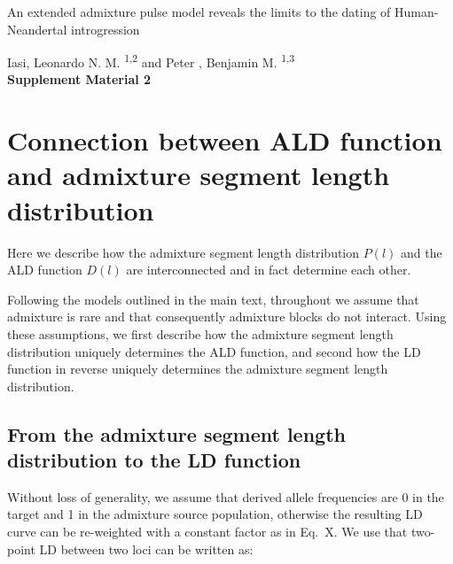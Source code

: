 \documentclass[11pt]{article}
\begin{document}
\begin{titlepage}


    \vspace*{1cm}
        
        
    \begin{center}       
        \large
        \vspace{1cm}
        An extended admixture pulse model reveals the limits to the dating of Human-Neandertal introgression
        
       \vspace{1.0cm}
        \large
        Iasi, Leonardo N. M. \textsuperscript{1,2} and Peter , Benjamin M. \textsuperscript{1,3} \\ 
        
        \vspace{1.0cm}
            \Huge
            \textbf{Supplement Material 2}
    \end{center} 

            

\end{titlepage}

\section{Connection between ALD function and admixture segment length distribution}

Here we describe how the admixture segment length distribution $P(l)$ and the ALD function $D(l)$ are interconnected and in fact determine each other.

Following the models outlined in the main text, throughout we assume that admixture is rare and that consequently admixture blocks do not interact. Using these assumptions, we first describe how the admixture segment length distribution uniquely determines the ALD function, and second how the LD function in reverse uniquely determines the admixture segment length distribution.

\subsection{From the admixture segment length distribution to the LD function}
Without loss of generality, we assume that derived allele frequencies are 0 in the target and 1 in the admixture source population, otherwise the resulting LD curve can be re-weighted with a constant factor as in Eq.~X. We use that two-point LD between two loci can be written as: 
\end{document}
